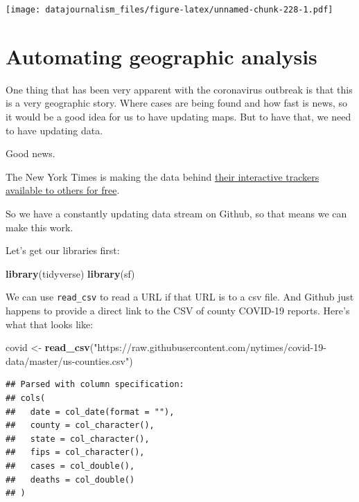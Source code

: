 \documentclass[]{book}
\newenvironment{Shaded}{\begin{snugshade}}{\end{snugshade}}
\newcommand{\KeywordTok}[1]{\textcolor[rgb]{0.13,0.29,0.53}{\textbf{#1}}}
\newcommand{\NormalTok}[1]{#1}
\newcommand{\StringTok}[1]{\textcolor[rgb]{0.31,0.60,0.02}{#1}}
\begin{document}
\texttt{[image: datajournalism\_files/figure-latex/unnamed-chunk-228-1.pdf]}

\hypertarget{automating-geographic-analysis}{%
\chapter{Automating geographic analysis}\label{automating-geographic-analysis}}

One thing that has been very apparent with the coronavirus outbreak is that this is a very geographic story. Where cases are being found and how fast is news, so it would be a good idea for us to have updating maps. But to have that, we need to have updating data.

Good news.

The New York Times is making the data behind \href{https://www.nytimes.com/interactive/2020/us/coronavirus-us-cases.html}{their interactive trackers} \href{https://github.com/nytimes/covid-19-data}{available to others for free}.

So we have a constantly updating data stream on Github, so that means we can make this work.

Let's get our libraries first:

\begin{Shaded}
\begin{Highlighting}[]
\KeywordTok{library}\NormalTok{(tidyverse)}
\KeywordTok{library}\NormalTok{(sf)}
\end{Highlighting}
\end{Shaded}

We can use \texttt{read\_csv} to read a URL if that URL is to a csv file. And Github just happens to provide a direct link to the CSV of county COVID-19 reports. Here's what that looks like:

\begin{Shaded}
\begin{Highlighting}[]
\NormalTok{covid <-}\StringTok{ }\KeywordTok{read_csv}\NormalTok{(}\StringTok{"https://raw.githubusercontent.com/nytimes/covid-19-data/master/us-counties.csv"}\NormalTok{)}
\end{Highlighting}
\end{Shaded}

\begin{verbatim}
## Parsed with column specification:
## cols(
##   date = col_date(format = ""),
##   county = col_character(),
##   state = col_character(),
##   fips = col_character(),
##   cases = col_double(),
##   deaths = col_double()
## )
\end{verbatim}
\end{document}
